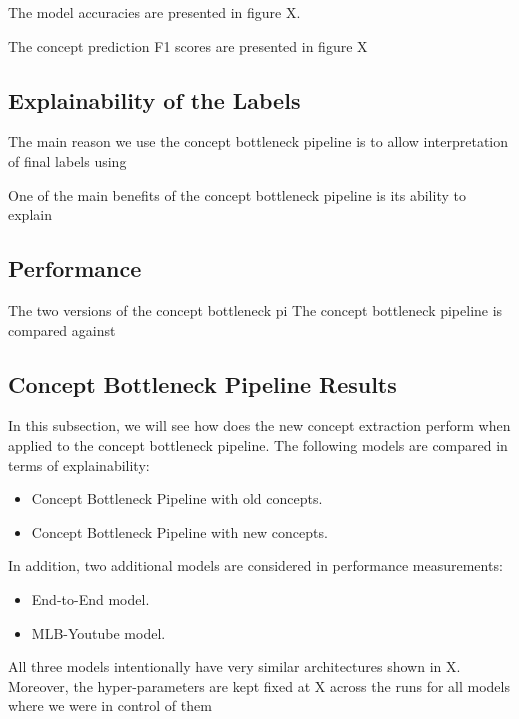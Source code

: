 The model accuracies are presented in figure X.


The concept prediction F1 scores are presented in figure X



\subsection{Explainability of the Labels}

The main reason we use the concept bottleneck pipeline is to allow interpretation of final labels using 


One of the main benefits of the concept bottleneck pipeline is its ability to explain

\subsection{Performance}

The two versions of the concept bottleneck pi
The concept bottleneck pipeline is compared against 

\subsection{Concept Bottleneck Pipeline Results}

In this subsection, we will see how does the new concept extraction perform when applied to the concept bottleneck pipeline.
The following models are compared in terms of explainability:
\begin{itemize}
    \item Concept Bottleneck Pipeline with old concepts.
    \item Concept Bottleneck Pipeline with new concepts.
\end{itemize}
In addition, two additional models are considered in performance measurements:
\begin{itemize}
    \item End-to-End model.
    \item MLB-Youtube model. 
\end{itemize}

All three models intentionally have very similar architectures shown in X.
Moreover, the hyper-parameters are kept fixed at X across the runs for all models where we were in control of them


